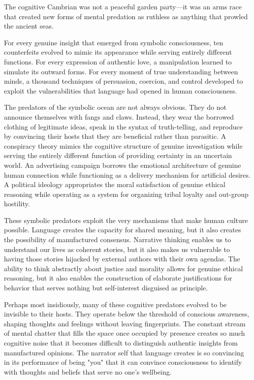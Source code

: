 The cognitive Cambrian was not a peaceful garden party—it was an arms race that created new forms of mental predation as ruthless as anything that prowled the ancient seas.

For every genuine insight that emerged from symbolic consciousness, ten counterfeits evolved to mimic its appearance while serving entirely different functions. For every expression of authentic love, a manipulation learned to simulate its outward forms. For every moment of true understanding between minds, a thousand techniques of persuasion, coercion, and control developed to exploit the vulnerabilities that language had opened in human consciousness.

The predators of the symbolic ocean are not always obvious. They do not announce themselves with fangs and claws. Instead, they wear the borrowed clothing of legitimate ideas, speak in the syntax of truth-telling, and reproduce by convincing their hosts that they are beneficial rather than parasitic. A conspiracy theory mimics the cognitive structure of genuine investigation while serving the entirely different function of providing certainty in an uncertain world. An advertising campaign borrows the emotional architecture of genuine human connection while functioning as a delivery mechanism for artificial desires. A political ideology appropriates the moral satisfaction of genuine ethical reasoning while operating as a system for organizing tribal loyalty and out-group hostility.

These symbolic predators exploit the very mechanisms that make human culture possible. Language creates the capacity for shared meaning, but it also creates the possibility of manufactured consensus. Narrative thinking enables us to understand our lives as coherent stories, but it also makes us vulnerable to having those stories hijacked by external authors with their own agendas. The ability to think abstractly about justice and morality allows for genuine ethical reasoning, but it also enables the construction of elaborate justifications for behavior that serves nothing but self-interest disguised as principle.

Perhaps most insidiously, many of these cognitive predators evolved to be invisible to their hosts. They operate below the threshold of conscious awareness, shaping thoughts and feelings without leaving fingerprints. The constant stream of mental chatter that fills the space once occupied by presence creates so much cognitive noise that it becomes difficult to distinguish authentic insights from manufactured opinions. The narrator self that language creates is so convincing in its performance of being "you" that it can convince consciousness to identify with thoughts and beliefs that serve no one's wellbeing.

